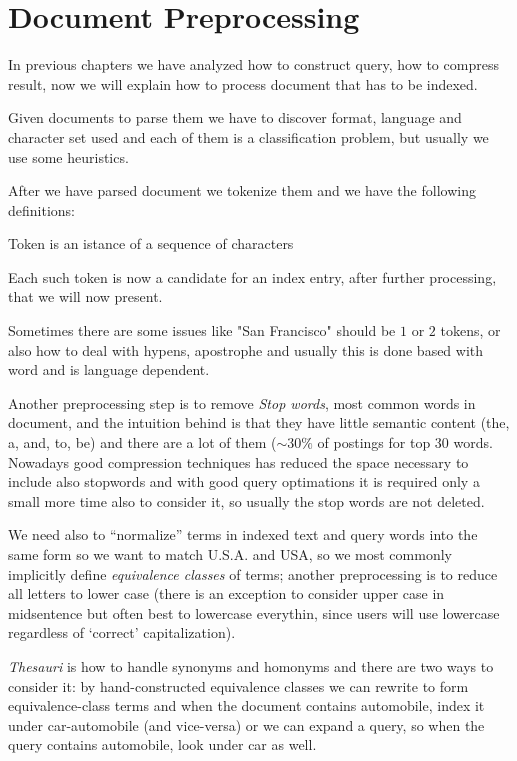 \chapter{Document Preprocessing}
In previous chapters we have analyzed how to construct query, how to compress result,
now we will explain how to process document that has to be indexed.

Given documents to parse them we have to discover format, language and character set
used and each of them is a classification problem, but usually we use some heuristics.

After we have parsed document we tokenize them and we have the following definitions:
\begin{defi}
     Token is an istance of a sequence of characters
\end{defi}
Each such token is now a candidate for an index entry, after further processing,
that we will now present.

Sometimes there are some issues like "San Francisco" should be $1$ or $2$ tokens, or
also how to deal with hypens, apostrophe and usually this is done based with word
and is language dependent.

Another preprocessing step is to remove \emph{Stop words}, most common words in
document, and the intuition behind is that they have little semantic content
(the, a, and, to, be) and there are a lot of them ($\sim 30\%$ of postings 
for top $30$ words.\newline
Nowadays good compression techniques has reduced the space necessary to include also
stopwords and with good query optimations it is required only a small more time also
to consider it, so usually the stop words are not deleted.

We need also to “normalize” terms in indexed text and query words into the same form
so we want to match U.S.A. and USA, so we most commonly implicitly define 
\emph{equivalence classes} of terms; another preprocessing is to reduce all letters
to lower case (there is an exception to consider upper case in midsentence but often
best to lowercase everythin, since users will use lowercase regardless
of ‘correct’ capitalization).

\emph{Thesauri} is how to handle synonyms and homonyms and there are two ways to consider it: by hand-constructed equivalence classes we can rewrite to form 
equivalence-class terms and when the document contains automobile, index it 
under car-automobile (and vice-versa) or we can expand a query, so when the query
contains automobile, look under car as well.

